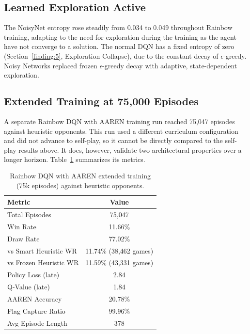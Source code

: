 \subsection{Learned Exploration Active}\label{finding:12}
The NoisyNet entropy rose steadily from 0.034 to 0.049 throughout Rainbow training, adapting to the need for exploration during the training as the agent have not converge to a solution. The normal DQN has a fixed entropy of zero (Section~\ref{finding:5}, Exploration Collapse), due to the constant decay of $\epsilon$-greedy. Noisy Networks replaced frozen $\epsilon$-greedy decay with adaptive, state-dependent exploration.

\subsection{Extended Training at 75,000 Episodes}

A separate Rainbow DQN with AAREN training run reached 75,047 episodes against heuristic opponents. This run used a different curriculum configuration and did not advance to self-play, so it cannot be directly compared to the self-play results above. It does, however, validate two architectural properties over a longer horizon. Table~\ref{tab:rdqn75k} summarizes its metrics.

\begin{table}[htbp]
\centering
\caption{Rainbow DQN with AAREN extended training (75k episodes) against heuristic opponents.}
\label{tab:rdqn75k}
\begin{tabular}{l c}
\hline
\textbf{Metric} & \textbf{Value} \\ \hline
Total Episodes          & 75,047 \\
Win Rate                & 11.66\% \\
Draw Rate               & 77.02\% \\
vs Smart Heuristic WR   & 11.74\% (38,462 games) \\
vs Frozen Heuristic WR  & 11.59\% (43,331 games) \\
Policy Loss (late)      & 2.84 \\
Q-Value (late)          & 1.84 \\
AAREN Accuracy          & 20.78\% \\
Flag Capture Ratio      & 99.96\% \\
Avg Episode Length      & 378 \\
\hline
\end{tabular}
\end{table}

